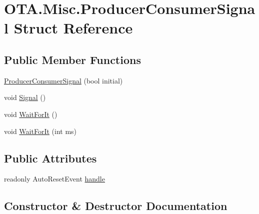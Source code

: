 \hypertarget{struct_o_t_a_1_1_misc_1_1_producer_consumer_signal}{}\section{O\+T\+A.\+Misc.\+Producer\+Consumer\+Signal Struct Reference}
\label{struct_o_t_a_1_1_misc_1_1_producer_consumer_signal}
\subsection*{Public Member Functions}
\begin{DoxyCompactItemize}
\item 
\hyperlink{struct_o_t_a_1_1_misc_1_1_producer_consumer_signal_a253e7a7d735330ac52097d4453389eba}{Producer\+Consumer\+Signal} (bool initial)
\item 
void \hyperlink{struct_o_t_a_1_1_misc_1_1_producer_consumer_signal_a1385fb7d8c4eb1f1810216afe0a7c00b}{Signal} ()
\item 
void \hyperlink{struct_o_t_a_1_1_misc_1_1_producer_consumer_signal_aa35df2d18ede3ae887e0579b5c3db400}{Wait\+For\+It} ()
\item 
void \hyperlink{struct_o_t_a_1_1_misc_1_1_producer_consumer_signal_af9d074ebbdefd937e63db167ace773de}{Wait\+For\+It} (int ms)
\end{DoxyCompactItemize}
\subsection*{Public Attributes}
\begin{DoxyCompactItemize}
\item 
readonly Auto\+Reset\+Event \hyperlink{struct_o_t_a_1_1_misc_1_1_producer_consumer_signal_a524f9fa328b6996eaa0bc5750b91c334}{handle}
\end{DoxyCompactItemize}


\subsection{Constructor \& Destructor Documentation}
\hypertarget{struct_o_t_a_1_1_misc_1_1_producer_consumer_signal_a253e7a7d735330ac52097d4453389eba}{}
